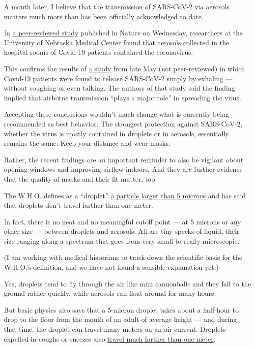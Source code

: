 A month later, I believe that the transmission of SARS-CoV-2 via
aerosols matters much more than has been officially acknowledged to
date.

In \href{https://www.nature.com/articles/s41598-020-69286-3}{a
peer-reviewed study} published in Nature on Wednesday, researchers at
the University of Nebraska Medical Center found that aerosols collected
in the hospital rooms of Covid-19 patients contained the coronavirus.

This confirms the results of
\href{https://www.medrxiv.org/content/10.1101/2020.05.31.20115154v1}{a
study} from late May (not peer-reviewed) in which Covid-19 patients were
found to release SARS-CoV-2 simply by exhaling --- without coughing or
even talking. The authors of that study said the finding implied that
airborne transmission ``plays a major role'' in spreading the virus.

Accepting these conclusions wouldn't much change what is currently being
recommended as best behavior. The strongest protection against
SARS-CoV-2, whether the virus is mostly contained in droplets or in
aerosols, essentially remains the same: Keep your distance and wear
masks.

Rather, the recent findings are an important reminder to also be
vigilant about opening windows and improving airflow indoors. And they
are further evidence that the quality of masks and their fit matter,
too.

The W.H.O. defines as a ``droplet''
\href{https://www.who.int/news-room/commentaries/detail/modes-of-transmission-of-virus-causing-covid-19-implications-for-ipc-precaution-recommendations}{a
particle larger than 5 microns} and has said that droplets don't travel
farther than one meter.

In fact, there is no neat and no meaningful cutoff point --- at 5
microns or any other size --- between droplets and aerosols: All are
tiny specks of liquid, their size ranging along a spectrum that goes
from very small to really microscopic.

(I am working with medical historians to track down the scientific basis
for the W.H.O.'s definition, and we have not found a sensible
explanation yet.)

Yes, droplets tend to fly through the air like mini cannonballs and they
fall to the ground rather quickly, while aerosols can float around for
many hours.

But basic physics also says that a 5-micron droplet takes about a
half-hour to drop to the floor from the mouth of an adult of average
height --- and during that time, the droplet can travel many meters on
an air current. Droplets expelled in coughs or sneezes also
\href{https://academic.oup.com/jid/advance-article/doi/10.1093/infdis/jiaa189/5820886}{travel
much farther than one meter}.

